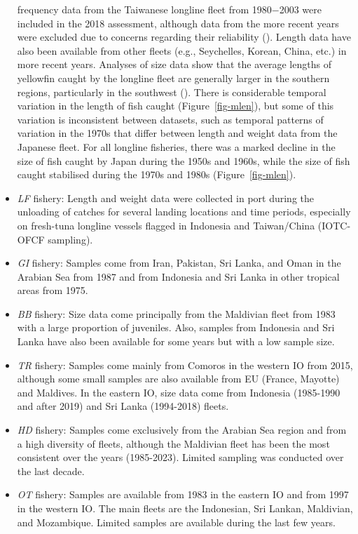 \documentclass[
]{scrartcl}
\begin{document}
\begin{itemize}
  frequency data from the Taiwanese longline fleet from 1980−2003 were
  included in the 2018 assessment, although data from the more recent
  years were excluded due to concerns regarding their reliability
  (). Length data have also been available from other fleets (e.g.,
  Seychelles, Korean, China, etc.) in more recent years. Analyses of
  size data show that the average lengths of yellowfin caught by the
  longline fleet are generally larger in the southern regions,
  particularly in the southwest
  (). There is
  considerable temporal variation in the length of fish caught
  (Figure~\ref{fig-mlen}), but some of this variation is inconsistent
  between datasets, such as temporal patterns of variation in the 1970s
  that differ between length and weight data from the Japanese fleet.
  For all longline fisheries, there was a marked decline in the size of
  fish caught by Japan during the 1950s and 1960s, while the size of
  fish caught stabilised during the 1970s and 1980s
  (Figure~\ref{fig-mlen}).
\item
  \emph{LF} fishery: Length and weight data were collected in port
  during the unloading of catches for several landing locations and time
  periods, especially on fresh-tuna longline vessels flagged in
  Indonesia and Taiwan/China (IOTC-OFCF sampling).
\item
  \emph{GI} fishery: Samples come from Iran, Pakistan, Sri Lanka, and
  Oman in the Arabian Sea from 1987 and from Indonesia and Sri Lanka in
  other tropical areas from 1975.
\item
  \emph{BB} fishery: Size data come principally from the Maldivian fleet
  from 1983 with a large proportion of juveniles. Also, samples from
  Indonesia and Sri Lanka have also been available for some years but
  with a low sample size.
\item
  \emph{TR} fishery: Samples come mainly from Comoros in the western IO
  from 2015, although some small samples are also available from EU
  (France, Mayotte) and Maldives. In the eastern IO, size data come from
  Indonesia (1985-1990 and after 2019) and Sri Lanka (1994-2018) fleets.
\item
  \emph{HD} fishery: Samples come exclusively from the Arabian Sea
  region and from a high diversity of fleets, although the Maldivian
  fleet has been the most consistent over the years (1985-2023). Limited
  sampling was conducted over the last decade.
\item
  \emph{OT} fishery: Samples are available from 1983 in the eastern IO
  and from 1997 in the western IO. The main fleets are the Indonesian,
  Sri Lankan, Maldivian, and Mozambique. Limited samples are available
  during the last few years.
\end{itemize}
\end{document}
